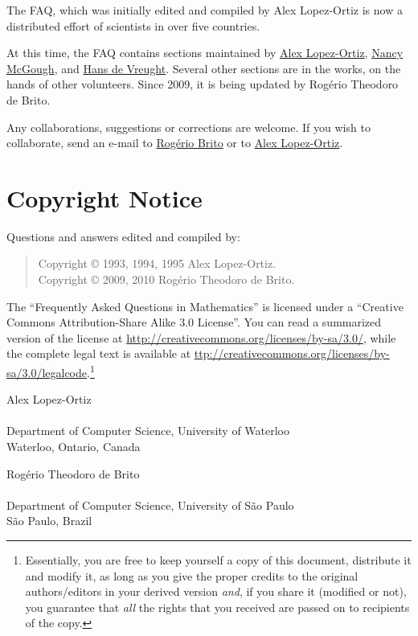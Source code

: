 The \scimath FAQ, which was initially edited and compiled by Alex
Lopez-Ortiz is now a distributed effort of scientists in over five
countries.

At this time, the FAQ contains sections maintained by
\href{mailto:\emailalopez}{Alex Lopez-Ortiz},
\href{mailto:\emailnancy}{Nancy McGough}, and
\href{mailto:\emailhans}{Hans de Vreught}.  Several other sections are
in the works, on the hands of other volunteers. Since 2009, it is being
updated by Rogério Theodoro de Brito.

Any collaborations, suggestions or corrections are welcome. If you wish
to collaborate, send an e-mail to
\href{mailto:\emailrbrito}{Rogério Brito} or to
\href{mailto:\emailalopez}{Alex Lopez-Ortiz}.

\section{Copyright Notice}

Questions and answers edited and compiled by:

\begin{verse}
  Copyright © 1993, 1994, 1995 Alex Lopez-Ortiz.\\
  Copyright © 2009, 2010 Rogério Theodoro de Brito.
\end{verse}

The ``Frequently Asked Questions in Mathematics'' is licensed under a
``Creative Commons Attribution-Share Alike 3.0 License''.  You can read
a summarized version of the license at
\url{http://creativecommons.org/licenses/by-sa/3.0/}, while the complete
legal text is available at
\url{ttp://creativecommons.org/licenses/by-sa/3.0/legalcode}.\footnote{
Essentially, you are free to keep yourself a copy of this document,
distribute it and modify it, as long as you give the proper credits to
the original authors/editors in your derived version \emph{and}, if you
share it (modified or not), you guarantee that \emph{all} the rights
that you received are passed on to recipients of the copy.}

\bigskip

\noindent
Alex Lopez-Ortiz\\
\emailalopez\\
Department of Computer Science, University of Waterloo\\
Waterloo, Ontario, Canada

\medskip

\noindent
Rogério Theodoro de Brito\\
\emailrbrito\\
Department of Computer Science, University of São Paulo\\
São Paulo, Brazil
